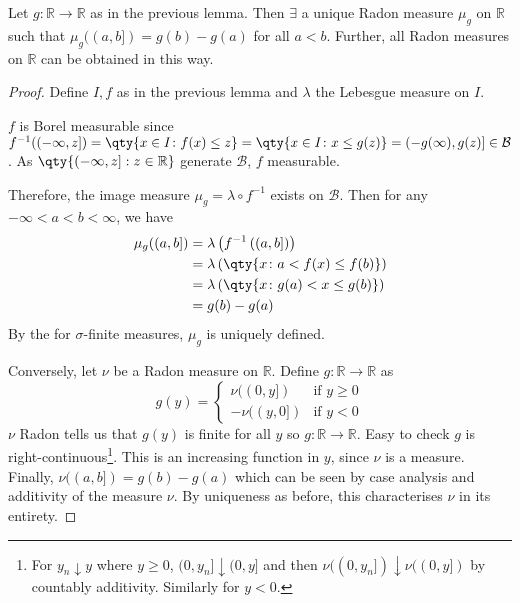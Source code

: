 \begin{theorem}
	Let $g \colon \mathbb R \to \mathbb R$ as in the previous lemma.
	Then $\exists$ a unique Radon measure $\mu_g$ on $\mathbb R$ such that $\mu_g((a,b]) = g(b) - g(a)$ for all $a < b$.
	Further, all Radon measures on $\mathbb{R}$ can be obtained in this way.
\end{theorem}

\begin{proof}
	Define $I, f$ as in the previous lemma and $\lambda$ the Lebesgue measure on $I$.

	$f$ is Borel measurable since $f^{-1}((-\infty,z]) = \qty{x \in I \colon f(x) \leq z} = \qty{x \in I \colon x \leq g(z)} = (-g(\infty),g(z)] \in \mathcal{B}$. As $\qty{(-\infty,z] : z \in \mathbb{R}}$ generate $\mathcal{B}$, $f$ measurable.

	Therefore, the image measure $\mu_g = \lambda \circ f^{-1}$ exists on $\mathcal{B}$.
	Then for any $-\infty < a < b < \infty$, we have
	\begin{align*}
		\mu_g((a,b]) &= \lambda \left( f^{-1}\left( (a,b] \right) \right) \\
		&= \lambda \left( \qty{x \colon a < f(x) \leq f(b)} \right) \\
		&= \lambda \left( \qty{x \colon g(a) < x \leq g(b)} \right) \\
		&= g(b) - g(a)
	\end{align*}
	By the  for $\sigma$-finite measures, $\mu_g$ is uniquely defined.

	Conversely, let $\nu$ be a Radon measure on $\mathbb R$.
	Define $g : \mathbb{R} \to \mathbb{R}$ as
	\[ g(y) = \begin{cases}
		\nu((0,y]) & \text{if } y \geq 0 \\
		-\nu((y,0]) & \text{if } y < 0
	\end{cases} \]
	$\nu$ Radon tells us that $g(y)$ is finite for all $y$ so $g : \mathbb{R} \to \mathbb{R}$.
	Easy to check $g$ is right-continuous\footnote{For $y_n \downarrow y$ where $y \geq 0$, $(0, y_n] \downarrow (0, y]$ and then $\nu((0, y_n]) \downarrow \nu((0, y])$ by countably additivity. Similarly for $y < 0$.}.
	This is an increasing function in $y$, since $\nu$ is a measure.
	Finally, $\nu((a,b]) = g(b) - g(a)$ which can be seen by case analysis and additivity of the measure $\nu$.
	By uniqueness as before, this characterises $\nu$ in its entirety.
\end{proof}

